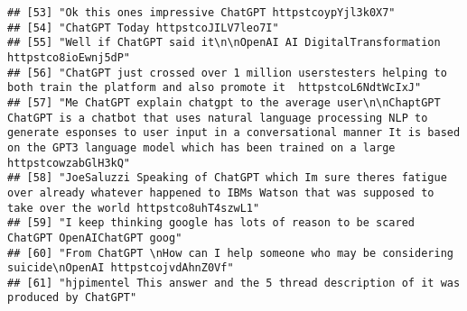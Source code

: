 \documentclass[
]{article}
\begin{document}
\begin{verbatim}
## [53] "Ok this ones impressive ChatGPT httpstcoypYjl3k0X7"                                                                                                                                                                                                                                                                
## [54] "ChatGPT Today httpstcoJILV7leo7I"                                                                                                                                                                                                                                                                                  
## [55] "Well if ChatGPT said it\n\nOpenAI AI DigitalTransformation httpstco8ioEwnj5dP"                                                                                                                                                                                                                                     
## [56] "ChatGPT just crossed over 1 million userstesters helping to both train the platform and also promote it  httpstcoL6NdtWcIxJ"                                                                                                                                                                                       
## [57] "Me ChatGPT explain chatgpt to the average user\n\nChaptGPT ChatGPT is a chatbot that uses natural language processing NLP to generate esponses to user input in a conversational manner It is based on the GPT3 language model which has been trained on a large httpstcowzabGlH3kQ"                               
## [58] "JoeSaluzzi Speaking of ChatGPT which Im sure theres fatigue over already whatever happened to IBMs Watson that was supposed to take over the world httpstco8uhT4szwL1"                                                                                                                                             
## [59] "I keep thinking google has lots of reason to be scared ChatGPT OpenAIChatGPT goog"                                                                                                                                                                                                                                 
## [60] "From ChatGPT \nHow can I help someone who may be considering suicide\nOpenAI httpstcojvdAhnZ0Vf"                                                                                                                                                                                                                   
## [61] "hjpimentel This answer and the 5 thread description of it was produced by ChatGPT"                                                                                                                                                                                                                                 

\end{verbatim}
\end{document}
